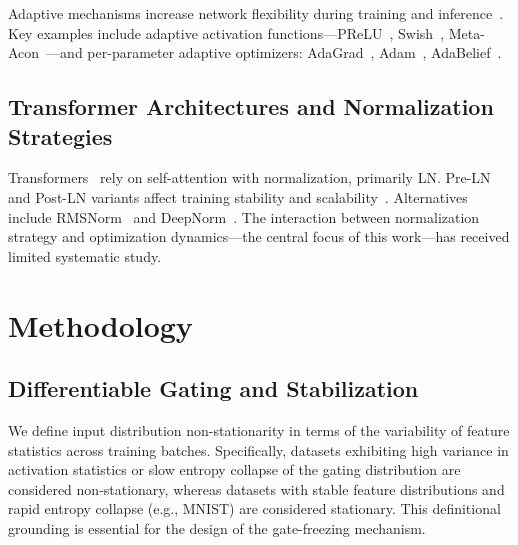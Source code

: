 \documentclass[conference]{IEEEtran}
\begin{document}
Adaptive mechanisms increase network flexibility during training and
inference~\cite{he2015prelu,ramachandran2017swish,ma2020metaacon,hu2018squeeze,chen2020dynamic}.
Key examples include adaptive activation functions---PReLU~\cite{he2015prelu},
Swish~\cite{ramachandran2017swish}, Meta-Acon~\cite{ma2020metaacon}---and
per-parameter adaptive optimizers: AdaGrad~\cite{duchi2011adagrad},
Adam~\cite{kingma2014adam}, AdaBelief~\cite{zhuang2020adabelief}.

\subsection{Transformer Architectures and Normalization Strategies}

Transformers~\cite{vaswani2017attention} rely on self-attention with
normalization, primarily LN. Pre-LN and Post-LN variants affect
training stability and scalability~\cite{xiong2020layernorm,wang2022deepnorm,bachlechner2020rezero}.
Alternatives include RMSNorm~\cite{zhang2019root} and
DeepNorm~\cite{wang2022deepnorm}. The interaction between normalization
strategy and optimization dynamics---the central focus of this
work---has received limited systematic study.

\section{Methodology}

\subsection{Differentiable Gating and Stabilization}
\label{sec:bottleneck_def}

We define input distribution non-stationarity in terms of the variability
of feature statistics across training batches. Specifically, datasets
exhibiting high variance in activation statistics or slow entropy
collapse of the gating distribution are considered non-stationary,
whereas datasets with stable feature distributions and rapid entropy
collapse (e.g., MNIST) are considered stationary. This definitional
grounding is essential for the design of the gate-freezing mechanism.
\end{document}
